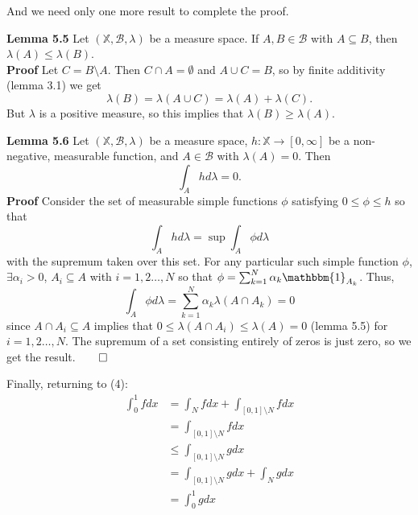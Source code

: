 \documentclass[11pt, letterpaper]{article}
\newcommand{\mbb}[1]{\mathbb{#1}}
\newcommand{\bbm}[1]{\mathbbm{#1}}
\newcommand{\mc}[1]{\mathcal{#1}}
\begin{document}
    And we need only one more result to complete the proof.
    \begin{center}
        \begin{minipage}[c]{0.85\linewidth}
            {\bf Lemma 5.5} Let $(\mbb{X},\mc{B},\lambda)$ be a measure space. If $A,B\in\mc{B}$ with $A\subseteq B$, then $\lambda(A)\leq \lambda(B)$.\\[10pt]
            {\bf Proof} Let $C=B\setminus A$. Then $C\cap A=\emptyset$ and $A\cup C=B$, so by finite additivity (lemma 3.1) we get
            \[\lambda(B)=\lambda(A\cup C)=\lambda(A)+\lambda(C).\]
            But $\lambda$ is a positive measure, so this implies that $\lambda(B)\geq \lambda(A)$.
        \end{minipage}
    \end{center}\vspace{10pt}
    \begin{center}
        \begin{minipage}[c]{0.85\linewidth}
            {\bf Lemma 5.6} Let $(\mbb{X},\mc{B},\lambda)$ be a measure space, $h:\mbb{X}\rightarrow[0,\infty]$ be a non-negative, measurable function, and $A\in\mc{B}$ with $\lambda(A)=0$.
            Then
            \[\int_Ahd\lambda=0.\]
            {\bf Proof} Consider the set of measurable simple functions  $\phi$ satisfying $0\leq \phi\leq h$ so that
            \[\int_A hd\lambda=\sup\int_A\phi d\lambda\]
            with the supremum taken over this set. For any particular such simple function $\phi$, $\exists \alpha_i>0$, $A_i\subseteq A$ with $i=1,2\dots, N$ so that $\phi=\sum_{k=1}^N\alpha_k\bbm{1}_{A_k}$. Thus,
            \[\int_A\phi d\lambda=\sum_{k=1}^N\alpha_k\lambda(A\cap A_k)=0\]
            since $A\cap A_i\subseteq A$ implies that $0\leq\lambda(A\cap A_i)\leq \lambda(A)=0$ (lemma 5.5) for $i=1,2\dots, N$. The supremum of a set consisting entirely of zeros is just zero, so we get the result.\hfill{$\qed$}
        \end{minipage}
    \end{center}\vspace{10pt}
    Finally, returning to (4):
    \begin{align*}
        \int_0^1fdx&=\int_Nfdx+\int_{[0,1]\setminus N}fdx\\
        &=\int_{[0,1]\setminus N}fdx\tag{lemma 5.6, since $\mu(N)=0$}\\
        &\leq\int_{[0,1]\setminus N}gdx\tag{since $\forall x\in[0,1]\setminus N$, $f(x)\leq g(x)$}\\
        &=\int_{[0,1]\setminus N}gdx+\int_Ngdx\tag{lemma 5.6, since $\mu(N)=0$}\\
        &=\int_0^1gdx
    \end{align*}
\end{document}
